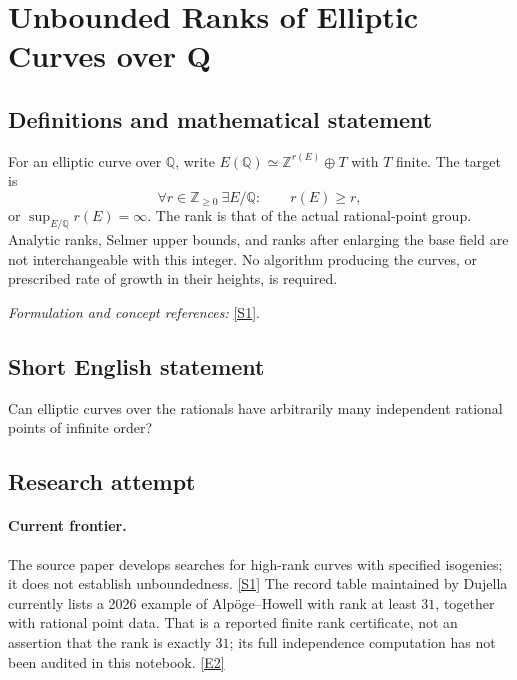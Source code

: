 \documentclass[11pt,a4paper]{article}
\newcommand{\Z}{\mathbb{Z}}
\newcommand{\Q}{\mathbb{Q}}
\newcommand{\sref}[2]{\hyperlink{source:#1:#2}{[S#2]}}
\newcommand{\eref}[2]{\hyperlink{extra:#1:#2}{[E#2]}}
\newif\ifshowcatalogue
\newcommand{\cataloguescope}[1]{\ifshowcatalogue
 \paragraph{Exact scope in the supplied catalogue.}
 \begin{quote}\small #1\end{quote}\fi}
\numberwithin{equation}{section}
\begin{document}
\setcounter{section}{0}
\clearpage
\section*{\texorpdfstring{Unbounded Ranks of Elliptic Curves over Q}{Unbounded Ranks of Elliptic Curves over Q}}\label{30006731}
\subsection{Definitions and mathematical statement}
For an elliptic curve over $\Q$, write $E(\Q)\simeq\Z^{r(E)}\oplus T$ with $T$ finite. The target is
\[
 \forall r\in\Z_{\ge0}\ \exists E/\Q:\qquad r(E)\ge r,
\]
or $\sup_{E/\Q}r(E)=\infty$. The rank is that of the actual rational-point group. Analytic ranks, Selmer upper bounds, and ranks after enlarging the base field are not interchangeable with this integer. No algorithm producing the curves, or prescribed rate of growth in their heights, is required.
\par\smallskip\textit{Formulation and concept references:} \sref{30006731}{1}.
\cataloguescope{Prove that for EVERY nonnegative integer r there is SOME elliptic curve E/Q whose actual Mordell-Weil group E(Q) has Z-rank at least r. The base field is exactly Q and rank means the free abelian rank in Mordell's theorem, not analytic rank, a Selmer bound or random-matrix corank. Thus the set of actual ranks of ALL elliptic curves over Q is unbounded. Counting one representative per Q-isomorphism class does not alter this existence question. No effective construction, specified family, uniform curve-producing algorithm or predetermined rate of growth is required.}
\subsection{Short English statement}
Can elliptic curves over the rationals have arbitrarily many independent rational points of infinite order?
\subsection{Research attempt}

\paragraph{Current frontier.}
The source paper develops searches for high-rank curves with specified
isogenies; it does not establish unboundedness. \sref{30006731}{1}
The record table maintained by Dujella currently lists a 2026 example of
Alp\"oge--Howell with rank at least $31$, together with rational point data.
That is a reported finite rank certificate, not an assertion that the rank
is exactly $31$; its full independence computation has not been audited in
this notebook. \eref{30006731}{2}
\end{document}
